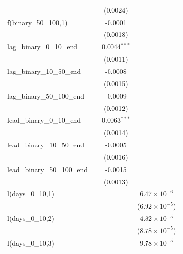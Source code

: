 \begin{tabular}{lccc}
                                          &          & (0.0024)              &   \\   
   f(binary\_50\_100,1)                   &          & -0.0001               &   \\   
                                          &          & (0.0018)              &   \\   
   lag\_binary\_0\_10\_end                &          & 0.0044$^{***}$        &   \\   
                                          &          & (0.0011)              &   \\   
   lag\_binary\_10\_50\_end               &          & -0.0008               &   \\   
                                          &          & (0.0015)              &   \\   
   lag\_binary\_50\_100\_end              &          & -0.0009               &   \\   
                                          &          & (0.0012)              &   \\   
   lead\_binary\_0\_10\_end               &          & 0.0063$^{***}$        &   \\   
                                          &          & (0.0014)              &   \\   
   lead\_binary\_10\_50\_end              &          & -0.0005               &   \\   
                                          &          & (0.0016)              &   \\   
   lead\_binary\_50\_100\_end             &          & -0.0015               &   \\   
                                          &          & (0.0013)              &   \\   
   l(days\_0\_10,1)                       &          &                       & $6.47\times 10^{-6}$\\    
                                          &          &                       & ($6.92\times 10^{-5}$)\\    
   l(days\_0\_10,2)                       &          &                       & $4.82\times 10^{-5}$\\    
                                          &          &                       & ($8.78\times 10^{-5}$)\\    
   l(days\_0\_10,3)                       &          &                       & $9.78\times 10^{-5}$\\    

\end{tabular}
